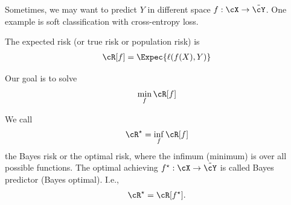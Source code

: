 \documentclass{article}
\begin{document}
Sometimes, we may want to predict $Y$ in different space $f:\cX\rightarrow \tilde{\cY}$.
One example is soft classification with cross-entropy loss.

\begin{definition}
    The expected risk (or true risk or population risk) is
    \begin{align}
        \cR[f] = \Expec{\ell(f(X), Y)}
    \end{align}
\end{definition}

Our goal is to solve 
\begin{align}
    \min_f \cR[f]
\end{align}

\begin{definition}
We call
\begin{align}
    \cR^\star = \inf_f \cR[f]
\end{align}
the Bayes risk or the optimal risk, where the infimum (minimum) is over all possible functions.
The optimal achieving $f^\star: \cX\rightarrow \tilde{\cY}$ is called Bayes predictor (Bayes optimal).
I.e.,
\begin{align}
    \cR^\star = \cR[f^\star].
\end{align}
\end{definition}
\end{document}
